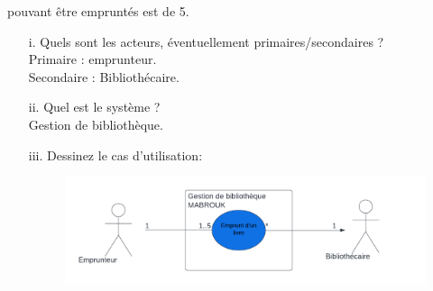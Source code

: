 \documentclass[12pt]{article}
\begin{document}
\begin{itemize}
\begin{itemize}
		pouvant être empruntés est de 5.
		\begin{itemize}
			\item[i. ] Quels sont les acteurs, éventuellement primaires/secondaires ?\\
			Primaire : emprunteur.\\
			Secondaire : Bibliothécaire.
			\item[ii. ] Quel est le système ?\\
			Gestion de bibliothèque.
			\item[iii. ] Dessinez le cas d’utilisation:
			\begin{figure}[!hbtp]
				\includegraphics[scale=0.75]{capture2.PNG}
			\end{figure}
			

\end{itemize}
\end{itemize}
\end{itemize}
\end{document}
